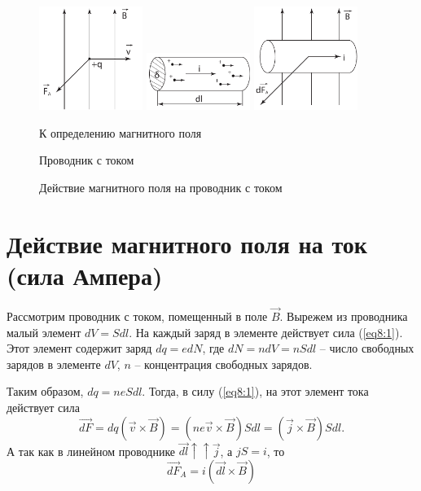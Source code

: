     \begin{figure}[b!]
        \center
        \includegraphics[width=0.3\textwidth]{lec08/magnetic_def.pdf}
        \hfill
        \includegraphics[width=0.3\textwidth]{lec08/conductor.pdf}
        \hfill
        \includegraphics[width=0.3\textwidth]{lec08/conductor_in_mf.pdf}
        \parbox[t]{.3\textwidth}{\caption{К определению магнитного поля}}
        \hfill
        \parbox[t]{.3\textwidth}{\caption{Проводник с током}}
        \hfill
        \parbox[t]{.3\textwidth}{\caption{Действие магнитного поля на проводник
            с током}}
    \end{figure}

\section{Действие магнитного поля на ток (сила Ампера)}

    Рассмотрим проводник с током, помещенный в поле \( \vec{B} \). Вырежем из
    проводника малый элемент \( dV = Sdl \). На каждый заряд в элементе
    действует сила (\ref{eq8:1}). Этот элемент содержит заряд \( dq = e dN \),
    где \( dN = ndV = nSdl \) -- число свободных зарядов в элементе \( dV \),
    \( n \) -- концентрация свободных зарядов.
    
    Таким образом, \( dq = neSdl \). Тогда, в силу (\ref{eq8:1}), на этот
    элемент тока действует сила
    \[
        \vec{dF} = dq(\vec{v} \times \vec{B}) = (ne\vec{v} \times \vec{B})Sdl =
        (\vec{j} \times \vec{B})Sdl.
    \]
    А так как в линейном проводнике \( \vec{dl} \uparrow\uparrow \vec{j} \), а
    \( jS = i \), то
    \begin{equation}
        \vec{dF}_A = i(\vec{dl} \times \vec{B})
        \label{eq8:2}
    \end{equation}
    
